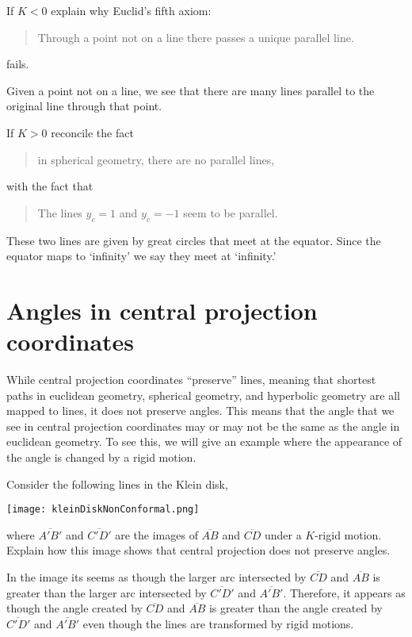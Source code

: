 \documentclass[newpage,hints,handout]{ximera}
\begin{document}
\begin{problem}
  If $K<0$ explain why Euclid's fifth axiom:
  \begin{quote}
    Through a point not on a line there passes a unique parallel line.
  \end{quote}
  fails.
  \begin{freeResponse}
    Given a point not on a line, we see that there are many lines
    parallel to the original line through that point.
  \end{freeResponse}
\end{problem}

\begin{problem}
  If $K>0$ reconcile the fact
  \begin{quote}
    in spherical geometry, there are no parallel lines,
  \end{quote}
  with the fact that 
  \begin{quote}
    The lines $y_c=1$ and $y_c = -1$ seem to be parallel.
  \end{quote}
  \begin{freeResponse}
    These two lines are given by great circles that meet at the
    equator. Since the equator maps to `infinity' we say they meet at
    `infinity.'
  \end{freeResponse}
\end{problem}

\section{Angles in central projection coordinates}

While central projection coordinates ``preserve'' lines, meaning that
shortest paths in euclidean geometry, spherical geometry, and
hyperbolic geometry are all mapped to lines, it does not preserve
angles. This means that the angle that we see in central projection
coordinates may or may not be the same as the angle in euclidean
geometry. To see this, we will give an example where the appearance of
the angle is changed by a rigid motion.


\begin{problem}
  Consider the following lines in the Klein disk,
  \begin{image}
    \texttt{[image: kleinDiskNonConformal.png]}
  \end{image}
  where $\overline{A'B'}$ and $\overline{C'D'}$ are the images of
  $\overline{AB}$ and $\overline{CD}$ under a $K$-rigid
  motion. Explain how this image shows that central projection does
  not preserve angles.
  
  \begin{freeResponse}
  In the image its seems as though the larger arc intersected by $\overline{CD}$ and $\overline{AB}$ is greater than the larger arc intersected by $\overline{C'D'}$ and $\overline{A'B'}$. Therefore, it appears as though the angle created by $\overline{CD}$ and $\overline{AB}$ is greater than the angle created by $\overline{C'D'}$ and $\overline{A'B'}$ even though the lines are transformed by rigid motions. 
  \end{freeResponse}
\end{problem}
\end{document}
